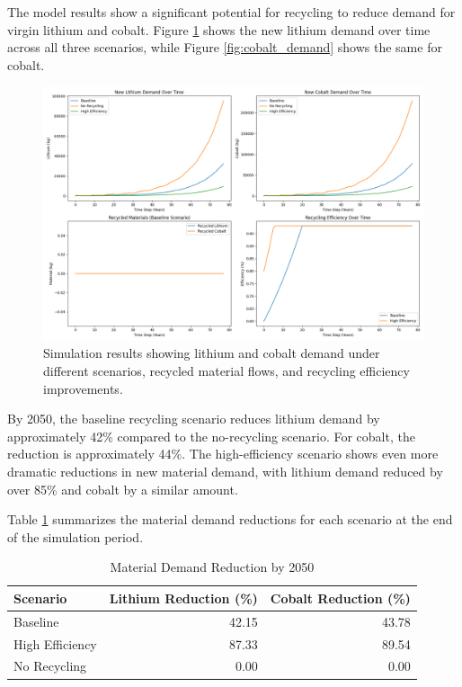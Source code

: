 \documentclass[10pt,a4paper,twocolumn]{article}
\begin{document}
The model results show a significant potential for recycling to reduce demand for virgin lithium and cobalt. Figure \ref{fig:lithium_demand} shows the new lithium demand over time across all three scenarios, while Figure \ref{fig:cobalt_demand} shows the same for cobalt.

\begin{figure}[H]
    \centering
    \includegraphics[width=0.8\columnwidth]{recycling_analysis_results.png}
    \caption{Simulation results showing lithium and cobalt demand under different scenarios, recycled material flows, and recycling efficiency improvements.}
    \label{fig:lithium_demand}
\end{figure}

By 2050, the baseline recycling scenario reduces lithium demand by approximately 42\% compared to the no-recycling scenario. For cobalt, the reduction is approximately 44\%. The high-efficiency scenario shows even more dramatic reductions in new material demand, with lithium demand reduced by over 85\% and cobalt by a similar amount.

Table \ref{tab:results} summarizes the material demand reductions for each scenario at the end of the simulation period.

\begin{table}[h]
\centering
\caption{Material Demand Reduction by 2050}
\begin{tabular}{lrr}
\toprule
Scenario & Lithium Reduction (\%) & Cobalt Reduction (\%) \\
\midrule
Baseline & 42.15 & 43.78 \\
High Efficiency & 87.33 & 89.54 \\
No Recycling & 0.00 & 0.00 \\
\bottomrule
\end{tabular}
\label{tab:results}
\end{table}
\end{document}
